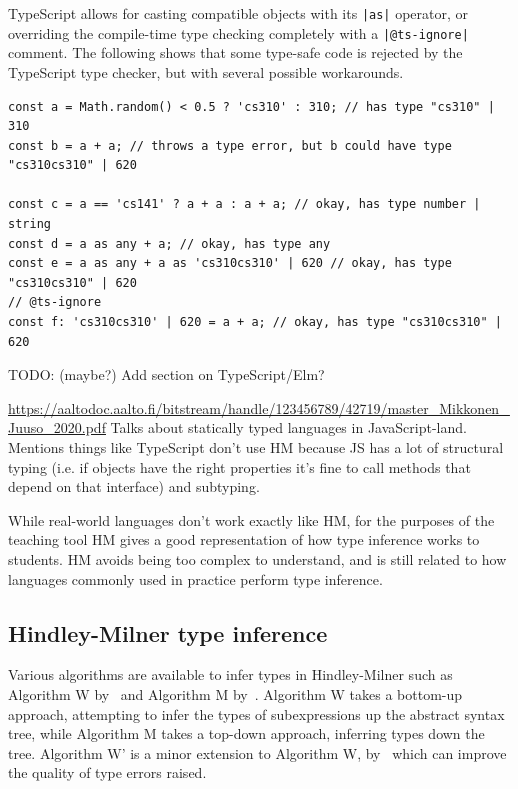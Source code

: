 \documentclass[a4paper,fleqn,12pt]{article}
\begin{document}
TypeScript allows for casting compatible objects with its \texttt{|as|} operator, or overriding the compile-time type checking completely with a \texttt{|@ts-ignore|} comment. The following shows that some type-safe code is rejected by the TypeScript type checker, but with several possible workarounds.

\begin{verbatim}
const a = Math.random() < 0.5 ? 'cs310' : 310; // has type "cs310" | 310
const b = a + a; // throws a type error, but b could have type "cs310cs310" | 620

const c = a == 'cs141' ? a + a : a + a; // okay, has type number | string
const d = a as any + a; // okay, has type any
const e = a as any + a as 'cs310cs310' | 620 // okay, has type "cs310cs310" | 620
// @ts-ignore
const f: 'cs310cs310' | 620 = a + a; // okay, has type "cs310cs310" | 620
\end{verbatim}

TODO: (maybe?) Add section on TypeScript/Elm?

\underline{\href{https://aaltodoc.aalto.fi/bitstream/handle/123456789/42719/master\_Mikkonen\_Juuso\_2020.pdf}{https://aaltodoc.aalto.fi/bitstream/handle/123456789/42719/master\_Mikkonen\_Juuso\_2020.pdf}}
Talks about statically typed languages in JavaScript-land. Mentions things like TypeScript don’t use HM because JS has a lot of structural typing (i.e. if objects have the right properties it’s fine to call methods that depend on that interface) and subtyping.

While real-world languages don’t work exactly like HM, for the purposes of the teaching tool HM gives a good representation of how type inference works to students. HM avoids being too complex to understand, and is still related to how languages commonly used in practice perform type inference.
\subsection{Hindley-Milner type inference}\label{id:h.admfqf7bhkct}
Various algorithms are available to infer types in Hindley-Milner such as Algorithm W by~\cite{ref26} and Algorithm M by~\cite{ref27}. Algorithm W takes a bottom-up approach, attempting to infer the types of subexpressions up the abstract syntax tree, while Algorithm M takes a top-down approach, inferring types down the tree. Algorithm W’ is a minor extension to Algorithm W, by~\cite{ref28} which can improve the quality of type errors raised.
\end{document}

